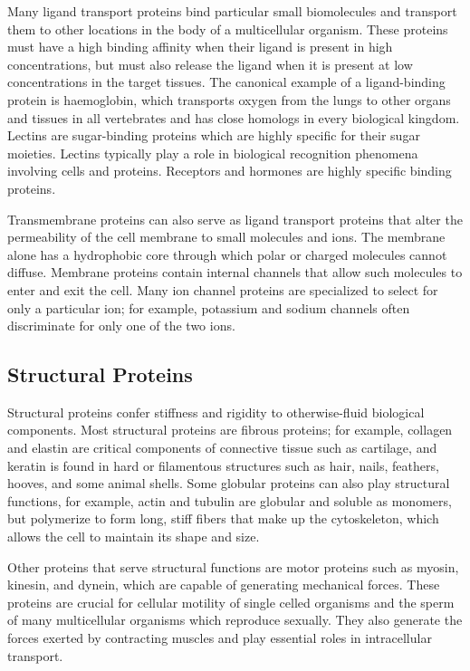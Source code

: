 Many ligand transport proteins bind particular small biomolecules and transport them to other locations in the body of a multicellular organism. These proteins must have a high binding affinity when their ligand is present in high concentrations, but must also release the ligand when it is present at low concentrations in the target tissues. The canonical example of a ligand-binding protein is haemoglobin, which transports oxygen from the lungs to other organs and tissues in all vertebrates and has close homologs in every biological kingdom. Lectins are sugar-binding proteins which are highly specific for their sugar moieties. Lectins typically play a role in biological recognition phenomena involving cells and proteins. Receptors and hormones are highly specific binding proteins.

Transmembrane proteins can also serve as ligand transport proteins that alter the permeability of the cell membrane to small molecules and ions. The membrane alone has a hydrophobic core through which polar or charged molecules cannot diffuse. Membrane proteins contain internal channels that allow such molecules to enter and exit the cell. Many ion channel proteins are specialized to select for only a particular ion; for example, potassium and sodium channels often discriminate for only one of the two ions.

\hypertarget{structural-proteins}{%
\subsection{Structural Proteins}\label{structural-proteins}}

Structural proteins confer stiffness and rigidity to otherwise-fluid biological components. Most structural proteins are fibrous proteins; for example, collagen and elastin are critical components of connective tissue such as cartilage, and keratin is found in hard or filamentous structures such as hair, nails, feathers, hooves, and some animal shells. Some globular proteins can also play structural functions, for example, actin and tubulin are globular and soluble as monomers, but polymerize to form long, stiff fibers that make up the cytoskeleton, which allows the cell to maintain its shape and size.

Other proteins that serve structural functions are motor proteins such as myosin, kinesin, and dynein, which are capable of generating mechanical forces. These proteins are crucial for cellular motility of single celled organisms and the sperm of many multicellular organisms which reproduce sexually. They also generate the forces exerted by contracting muscles and play essential roles in intracellular transport.

